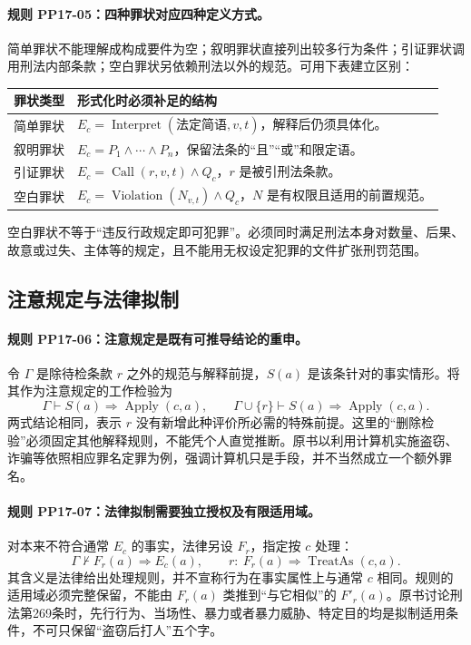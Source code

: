 \paragraph{规则 PP17-05：四种罪状对应四种定义方式。}
\mbox{}\par
简单罪状不能理解成构成要件为空；叙明罪状直接列出较多行为条件；引证罪状调用刑法内部条款；空白罪状另依赖刑法以外的规范。可用下表建立区别：
\begin{center}
\begin{tabular}{p{.17\linewidth}p{.70\linewidth}}
\hline
罪状类型 & 形式化时必须补足的结构\\ \hline
简单罪状 & $E_c=\operatorname{Interpret}(\text{法定简语},v,t)$，解释后仍须具体化。\\
叙明罪状 & $E_c=P_1\land\cdots\land P_n$，保留法条的“且”“或”和限定语。\\
引证罪状 & $E_c=\operatorname{Call}(r,v,t)\land Q_c$，$r$ 是被引刑法条款。\\
空白罪状 & $E_c=\operatorname{Violation}(N_{v,t})\land Q_c$，$N$ 是有权限且适用的前置规范。\\ \hline
\end{tabular}
\end{center}
空白罪状不等于“违反行政规定即可犯罪”。必须同时满足刑法本身对数量、后果、故意或过失、主体等的规定，且不能用无权设定犯罪的文件扩张刑罚范围。

\subsection{注意规定与法律拟制}
\paragraph{规则 PP17-06：注意规定是既有可推导结论的重申。}
\mbox{}\par
令 $\Gamma$ 是除待检条款 $r$ 之外的规范与解释前提，$S(a)$ 是该条针对的事实情形。将其作为注意规定的工作检验为
\[
\Gamma\vdash S(a)\Rightarrow\operatorname{Apply}(c,a),
\qquad
\Gamma\cup\{r\}\vdash S(a)\Rightarrow\operatorname{Apply}(c,a).
\]
两式结论相同，表示 $r$ 没有新增此种评价所必需的特殊前提。这里的“删除检验”必须固定其他解释规则，不能凭个人直觉推断。原书以利用计算机实施盗窃、诈骗等依照相应罪名定罪为例，强调计算机只是手段，并不当然成立一个额外罪名。

\paragraph{规则 PP17-07：法律拟制需要独立授权及有限适用域。}
\mbox{}\par
对本来不符合通常 $E_c$ 的事实，法律另设 $F_r$，指定按 $c$ 处理：
\[
\Gamma\nvdash F_r(a)\Rightarrow E_c(a),
\qquad
r:\ F_r(a)\Rightarrow\operatorname{TreatAs}(c,a).
\]
其含义是法律给出处理规则，并不宣称行为在事实属性上与通常 $c$ 相同。规则的适用域必须完整保留，不能由 $F_r(a)$ 类推到“与它相似”的 $F'_r(a)$。原书讨论刑法第269条时，先行行为、当场性、暴力或者暴力威胁、特定目的均是拟制适用条件，不可只保留“盗窃后打人”五个字。

